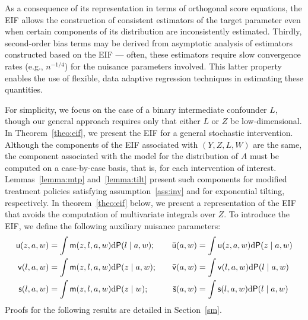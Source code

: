 As a consequence of its representation in terms of orthogonal score equations,
the EIF allows the construction of consistent estimators of the target parameter
even when certain components of its distribution are inconsistently estimated.
Thirdly, second-order bias terms may be derived from asymptotic analysis of
estimators constructed based on the EIF --- often, these estimators require slow
convergence rates (e.g., $n^{-1/4}$) for the nuisance parameters involved. This
latter property enables the use of flexible, data adaptive regression techniques
in estimating these quantities.

For simplicity, we focus on the case of a binary intermediate confounder $L$,
though our general approach requires only that either $L$ or $Z$ be
low-dimensional. In Theorem~\ref{theo:eif}, we present the EIF for a general
stochastic intervention. Although the components of the EIF associated with
$(Y,Z,L,W)$ are the same, the component associated with the model for the
distribution of $A$ must be computed on a case-by-case basis, that is, for each
intervention of interest. Lemmas~\ref{lemma:mtp} and~\ref{lemma:tilt} present
such components for modified treatment policies satisfying
assumption~\ref{ass:inv} and for exponential tilting, respectively. In
theorem~\ref{theo:eif} below, we present a representation of the EIF that avoids
the computation of multivariate integrals over $Z$. To introduce the EIF, we
define the following auxiliary nuisance parameters:
\begin{equation}
  \begin{split}
  \mathsf{u}(z,a,w) & = \int \mathsf{m}(z,l,a,w) \mathrm{d}\mathsf{P}(l\mid a,w);\\
  \mathsf{v}(l,a,w) & = \int \mathsf{m}(z,l,a,w) \mathrm{d}\mathsf{P}(z\mid a,w);\\
  \mathsf{s}(l,a,w) & = \int \mathsf{m}(z,l,a,w) \mathrm{d}\mathsf{P}(z\mid w);
\end{split}\quad\quad
\begin{split}
\bar {\mathsf{u}}(a,w) & = \int \mathsf{u}(z,a,w) \mathrm{d}\mathsf{P}(z\mid a,w)\\
  \bar {\mathsf{v}}(a,w) & = \int \mathsf{v}(l,a,w) \mathrm{d}\mathsf{P}(l\mid a,w)\\
  \bar {\mathsf{s}}(a,w) & = \int \mathsf{s}(l,a,w) \mathrm{d}\mathsf{P}(l\mid a,w)
\end{split}\label{eq:nuis}
\end{equation}
Proofs for the following results are detailed in Section~\ref{sm}.
